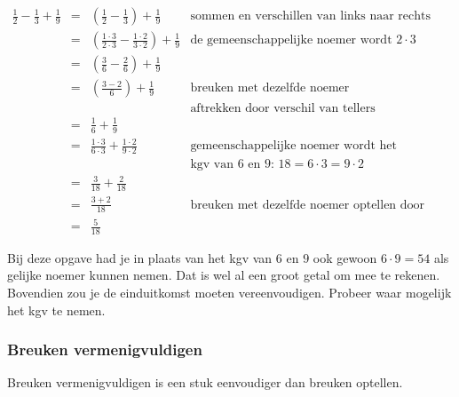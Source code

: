 \begin{equation*}
\begin{array}{cclr}
\frac{1}{2}-\frac{1}{3}+\frac{1}{9} &=& (\frac{1}{2}-\frac{1}{3})+\frac{1}{9} & \text{sommen en verschillen van links naar rechts} \\
&=& (\frac{1 \cdot 3}{2 \cdot 3}-\frac{1\cdot 2}{3 \cdot 2})+\frac{1}{9} & \text{de gemeenschappelijke noemer wordt $2 \cdot 3$} \\
&=& (\frac{3}{6}-\frac{2}{6})+\frac{1}{9} &  \\
&=& (\frac{3-2}{6})+\frac{1}{9} &  \text{breuken met dezelfde noemer} \\
& & & \text{aftrekken door verschil van tellers}  \\
&=& \frac{1}{6}+\frac{1}{9} &   \\
&=& \frac{1\cdot 3}{6\cdot 3}+\frac{1\cdot 2}{9\cdot 2} & \text{gemeenschappelijke noemer wordt het} \\
& & & \text{kgv van $6$ en $9$: $18=6 \cdot 3 = 9 \cdot 2$} \\
&=& \frac{3}{18}+\frac{2}{18} &   \\
&=& \frac{3+2}{18} & \text{breuken met dezelfde noemer optellen door som van tellers}\\
&=& \frac{5}{18}
\end{array}
\end{equation*}

Bij deze opgave had je in plaats van het kgv van $6$ en $9$ ook gewoon $6\cdot 9=54$ als gelijke noemer kunnen nemen. Dat is wel al een groot getal om mee te rekenen. Bovendien zou je de einduitkomst moeten vereenvoudigen. Probeer waar mogelijk het kgv te nemen.




\subsubsection{Breuken vermenigvuldigen}

Breuken vermenigvuldigen is een stuk eenvoudiger dan breuken optellen.



